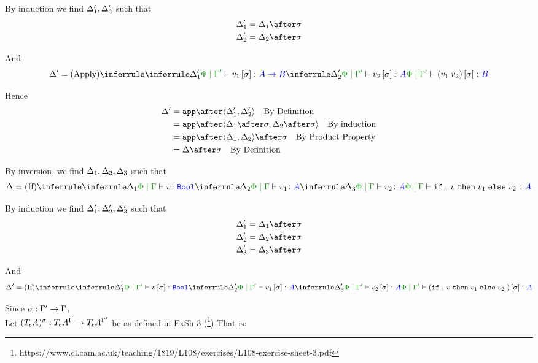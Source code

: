 \documentclass{report}
\begin{document}
By induction we find $\Delta_1', \Delta_2'$ such that 
\begin{align*}
    \D_1' &= \D_1\after\si\\
    \D_2' &= \D_2\after\si\\
\end{align*}

And
\begin{equation}
    \D' = \ntreeruleII{Apply}{\treeruleI{\D_1'}{\etyperelation{\P}{\G'}{v_1\ssi}{\ab}}}{\treeruleI{\D_2'}{\etyperelation{\P}{\G'}{v_2\ssi}{A}}}{\etyperelation{\P}{\G'}{(\apply{v_1}{v_2})\ssi}{B}}
\end{equation}

Hence
\begin{align*}
    \D' &= \app\after\pr{\D_1'}{\D_2'}\qt{By Definition}\\
        &= \app\after\pr{\D_1\after\si}{\D_2\after\si}\qt{By induction}\\
        &= \app\after\pr{\D_1}{\D_2}\after\si\qt{By Product Property}\\
        & = \D\after\si\qt{By Definition}\\
\end{align*}



By inversion, we find $\Delta_1, \Delta_2, \Delta_3$ such that
\begin{equation}
    \D = \ntreeruleIII{If}{\treeruleI{\D_1}{\etyperelation{\P}{\G}{v}{\B}}}{\treeruleI{\D_2}{\etyperelation{\P}{\G}{v_1}{A}}}{\treeruleI{\D_3}{\etyperelation{\P}{\G}{v_2}{A}}}{\etyperelation{\P}{\G}{\pifthenelse{A}{v}{v_1}{v_2}}{A}}
\end{equation}

By induction we find $\Delta_1', \Delta_2', \Delta_3'$ such that 
\begin{align*}
    \D_1' &= \D_1\after\si\\
    \D_2' &= \D_2\after\si\\
    \D_3' &= \D_3\after\si\\
\end{align*}

And
\begin{equation}
    \D' = \ntreeruleIII{If}{\treeruleI{\D_1'}{\etyperelation{\P}{\G'}{v\ssi}{\B}}}{\treeruleI{\D_2'}{\etyperelation{\P}{\G'}{v_1\ssi}{A}}}{\treeruleI{\D_3'}{\etyperelation{\P}{\G'}{v_2\ssi}{A}}}{\etyperelation{\P}{\G'}{(\pifthenelse{A}{v}{v_1}{v_2})\ssi}{A}}
\end{equation}

Since $\sigma: \Gamma' \rightarrow \Gamma$, \\
Let $(T_{\epsilon}{A})^{\sigma}: T_{\epsilon}{A}^{\Gamma}\rightarrow T_{\epsilon}{A}^{\Gamma'}$ be as defined in ExSh 3 (\footnote{https://www.cl.cam.ac.uk/teaching/1819/L108/exercises/L108-exercise-sheet-3.pdf})
That is:
\end{document}
